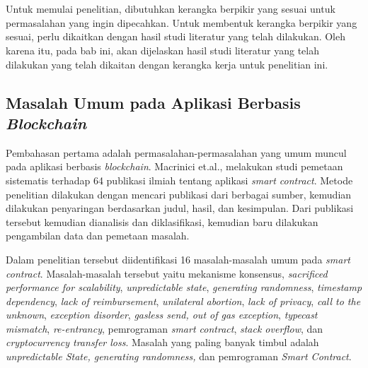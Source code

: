 \chapter{\babDua}
\label{bab:2}
Untuk memulai penelitian, dibutuhkan kerangka berpikir yang sesuai untuk permasalahan yang ingin dipecahkan. Untuk membentuk kerangka berpikir yang sesuai, perlu dikaitkan dengan hasil studi literatur yang telah dilakukan. Oleh karena itu, pada bab ini, akan dijelaskan hasil studi literatur yang telah dilakukan yang telah dikaitan dengan kerangka kerja untuk penelitian ini.

\section{Masalah Umum pada Aplikasi Berbasis \textit{Blockchain}}
\label{sec:masalahblockchain}

Pembahasan pertama adalah permasalahan-permasalahan yang umum muncul pada aplikasi berbasis \textit{blockchain}. Macrinici et.al., \citep{Macrinici2018} melakukan studi pemetaan sistematis terhadap 64 publikasi ilmiah tentang aplikasi \textit{smart contract}. Metode penelitian dilakukan dengan mencari publikasi dari berbagai sumber, kemudian dilakukan penyaringan berdasarkan judul, hasil, dan kesimpulan. Dari publikasi tersebut kemudian dianalisis dan diklasifikasi, kemudian baru dilakukan pengambilan data dan pemetaan masalah.

Dalam penelitian tersebut diidentifikasi 16 masalah-masalah umum pada \textit{smart contract}. Masalah-masalah tersebut yaitu mekanisme konsensus, \textit{sacrificed performance for scalability}, \textit{unpredictable state}, \textit{generating randomness}, \textit{timestamp dependency}, \textit{lack of reimbursement}, \textit{unilateral abortion}, \textit{lack of privacy}, \textit{call to the unknown}, \textit{exception disorder}, \textit{gasless send, out of gas exception}, \textit{typecast mismatch}, \textit{re-entrancy}, pemrograman \textit{smart contract}, \textit{stack overflow}, dan \textit{cryptocurrency transfer loss}. Masalah yang paling banyak timbul adalah \textit{unpredictable State, generating randomness,} dan pemrograman \textit{Smart Contract}. 

